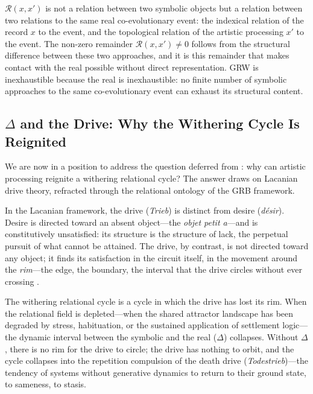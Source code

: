 \begin{claim}
$\mathcal{R}(x, x')$ is not a relation between two symbolic objects but a relation between two relations to the same real co-evolutionary event: the indexical relation of the record $x$ to the event, and the topological relation of the artistic processing $x'$ to the event. The non-zero remainder $\mathcal{R}(x, x') \neq 0$ follows from the structural difference between these two approaches, and it is this remainder that makes contact with the real possible without direct representation. GRW is inexhaustible because the real is inexhaustible: no finite number of symbolic approaches to the same co-evolutionary event can exhaust its structural content.
\end{claim}

\subsection{$\Delta$ and the Drive: Why the Withering Cycle Is Reignited}
\label{p15:subsec:delta}

\noindent
We are now in a position to address the question deferred from : why can artistic processing reignite a withering relational cycle? The answer draws on Lacanian drive theory, refracted through the relational ontology of the GRB framework.

In the Lacanian framework, the drive (\emph{Trieb}) is distinct from desire (\emph{désir}). Desire is directed toward an absent object---the \emph{objet petit a}---and is constitutively unsatisfied: its structure is the structure of lack, the perpetual pursuit of what cannot be attained. The drive, by contrast, is not directed toward any object; it finds its satisfaction in the circuit itself, in the movement around the \emph{rim}---the edge, the boundary, the interval that the drive circles without ever crossing \parencite{lacan2006}.

The withering relational cycle is a cycle in which the drive has lost its rim. When the relational field is depleted---when the shared attractor landscape has been degraded by stress, habituation, or the sustained application of settlement logic---the dynamic interval between the symbolic and the real ($\Delta$) collapses. Without $\Delta$, there is no rim for the drive to circle; the drive has nothing to orbit, and the cycle collapses into the repetition compulsion of the death drive (\emph{Todestrieb})---the tendency of systems without generative dynamics to return to their ground state, to sameness, to stasis.

